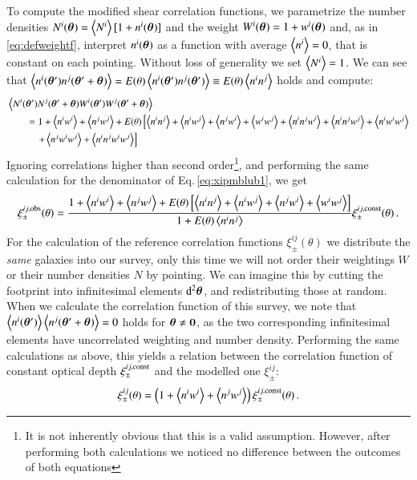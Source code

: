 To compute the modified shear correlation functions, we parametrize the number densities \linebreak$N^{i}(\b \theta)=\la N^{i} \ra [1+n^{i}(\b \theta)]$ and the weight $W^{i}(\b \theta)=1+w^{i}(\b \theta)$ and, as in \eqref{eq:defweightf}, interpret $n^{i}(\b \theta)$ as a function with average $\la n^{i} \ra = 0$, that is constant on each pointing. Without loss of generality we set $\la N^i\ra = 1$. We can see that $\la n^i(\bth)n^j(\bthp)\ra = E(\theta)\la n^i(\bth)n^j(\bth)\ra \equiv E(\theta)\la n^i n^j \ra$ holds and compute:
\begin{align}
&\la N^i(\bth)N^j(\bthp)W^i(\bth)W^j(\bthp)\ra \nonumber\\
&\qquad =  1 + \la n^iw^i\ra + \la n^j w^j\ra + E(\theta)\left[ \la n^in^j\ra + \la n^i w^j \ra  + \la n^jw^i\ra + \la w^iw^j\ra + \la n^in^jw^i\ra + \la n^in^jw^j\ra + \la n^iw^iw^j\ra \right. \nonumber\\
&\qquad\quad \left. + \la n^jw^iw^j\ra + \la n^in^jw^iw^j\ra  \right] 
 \end{align}
Ignoring correlations higher than second order\footnote{It is not inherently obvious that this is a valid assumption. However, after performing both calculations we noticed no difference between the outcomes of both equations}, and performing the same calculation for the denominator of Eq.\,\eqref{eq:xipmblub1}, we get
 \begin{align}
 \xi^{ij,\rm{obs}}_\pm(\theta) = \frac{1 + \la n^iw^i\ra + \la n^jw^j\ra + E(\theta)\left[\la n^in^j\ra + \la n^iw^j\ra + \la n^j w^i\ra + \la w^iw^j\ra\right]}{1+E(\theta)\la n^i n^j\ra }\xi^{ij,\rm{const}}_\pm (\theta) \, .
 \end{align}
For the calculation of the reference correlation functions $\xi_\pm^{ij}(\theta)$ we distribute the \textit{same} galaxies into our survey, only this time we will not order their weightings $W$ or their number densities $N$ by pointing. We can imagine this by cutting the footprint into infinitesimal elements $\d^2\b\theta$, and redistributing those at random. When we calculate the correlation function of this survey, we note that $\la n^i(\bth)\ra \la n^j(\bthp)\ra = 0$ holds for $\b\theta\neq \b 0$, as the two corresponding infinitesimal elements have uncorrelated weighting and number density. Performing the same calculations as above, this yields a relation between the correlation function of constant optical depth $\xi_\pm^{ij,\rm{const}}$ and the modelled one $\xi_\pm^{ij}$:
\begin{equation}
\xi_\pm^{ij}(\theta) = \left(1+\la n^iw^i\ra + \la n^jw^j\ra \right)\xi_\pm^{ij,\rm{const}}(\theta)\, .
\end{equation}
